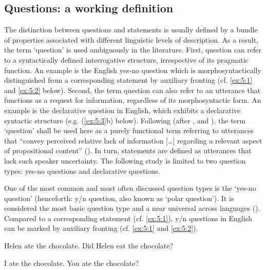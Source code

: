 \subsection{Questions: a working definition}
The distinction between questions and statements is usually defined by a bundle of properties associated with different linguistic levels of description. As a result, the term ‘question’ is used ambiguously in the literature. First, question can refer to a syntactically defined interrogative structure, irrespective of its pragmatic function. An example is the English yes-no question which is morphosyntactically distinguished from a corresponding statement by auxiliary fronting (cf. \ref{ex:5:1} and \ref{ex:5:2} below). Second, the term question can also refer to an utterance that functions as a request for information, regardless of its morphosyntactic form. An example is the declarative question in English, which exhibits a declarative syntactic structure (e.g. (\ref{ex:5:3}b) below). Following \citet{Bartels1999} (after \citealt{Lyons1977}, and \citealt{Jacobs1991}), the term ‘question’ shall be used here as a purely functional term referring to utterances that “convey perceived relative lack of information […] regarding a relevant aspect of propositional content” (\citealt[9]{Bartels1999}). In turn, statements are defined as utterances that lack such speaker uncertainty. The following study is limited to two question types: yes-no questions and declarative questions.

One of the most common and most often discussed question types is the ‘yes-no question’ (henceforth: y/n question, also known as ‘polar question’). It is considered the most basic question type and a near universal across languages (\citealt{SadockZwicky1985}). Compared to a corresponding statement (cf. \ref{ex:5:1}), y/n questions in English can be marked by auxiliary fronting (cf. \ref{ex:5:1} and \ref{ex:5:2}).

\begin{exe}
\ex\label{ex:5:1} Helen ate the chocolate.
\ex\label{ex:5:2} Did Helen eat the chocolate?
\ex\label{ex:5:3} 
\begin{xlist}
                \ex\label{ex:5:3a} I ate the chocolate.
                \ex\label{ex:5:3b} You ate the chocolate?
\end{xlist}
\end{exe} 

